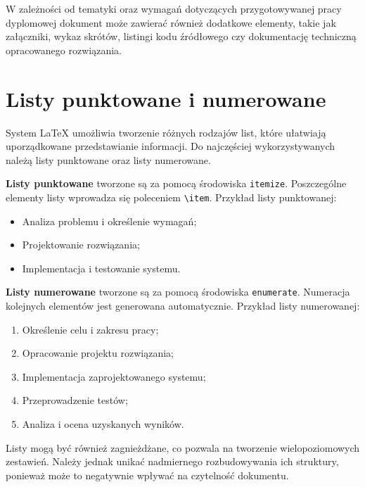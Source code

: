 W zależności od tematyki oraz wymagań dotyczących przygotowywanej pracy dyplomowej dokument może zawierać również dodatkowe elementy, takie jak załączniki, wykaz skrótów, listingi kodu źródłowego czy dokumentację techniczną opracowanego rozwiązania.

\section{Listy punktowane i numerowane}

System \LaTeX{} umożliwia tworzenie różnych rodzajów list, które ułatwiają uporządkowane przedstawianie informacji. Do najczęściej wykorzystywanych należą listy punktowane oraz listy numerowane.

\noindent
\textbf{Listy punktowane} tworzone są za pomocą środowiska \texttt{itemize}. Poszczególne elementy listy wprowadza się poleceniem \verb|\item|. Przykład listy punktowanej:

\begin{itemize}
    \item Analiza problemu i określenie wymagań;
    \item Projektowanie rozwiązania;
    \item Implementacja i testowanie systemu.
\end{itemize}

\noindent
\textbf{Listy numerowane} tworzone są za pomocą środowiska \texttt{enumerate}. Numeracja kolejnych elementów jest generowana automatycznie. Przykład listy numerowanej:

\begin{enumerate}
    \item Określenie celu i zakresu pracy;
    \item Opracowanie projektu rozwiązania;
    \item Implementacja zaprojektowanego systemu;
    \item Przeprowadzenie testów;
    \item Analiza i ocena uzyskanych wyników.
\end{enumerate}

Listy mogą być również zagnieżdżane, co pozwala na tworzenie wielopoziomowych zestawień. Należy jednak unikać nadmiernego rozbudowywania ich struktury, ponieważ może to negatywnie wpływać na czytelność dokumentu.

